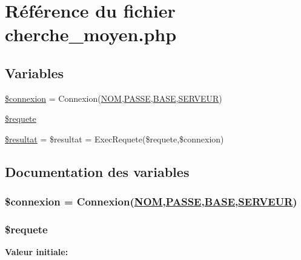 \hypertarget{cherche__moyen_8php}{
\section{R\'{e}f\'{e}rence du fichier cherche\_\-moyen.php}
\label{cherche__moyen_8php}
}
\subsection*{Variables}
\begin{CompactItemize}
\item 
\hyperlink{cherche__moyen_8php_a0}{\$connexion} = Connexion(\hyperlink{pma__connect_8php_a0}{NOM},\hyperlink{pma__connect_8php_a1}{PASSE},\hyperlink{pma__connect_8php_a3}{BASE},\hyperlink{pma__connect_8php_a2}{SERVEUR})
\item 
\hyperlink{cherche__moyen_8php_a1}{\$requete}
\item 
\hyperlink{cherche__moyen_8php_a2}{\$resultat} = \$resultat = Exec\-Requete(\$requete,\$connexion)
\end{CompactItemize}


\subsection{Documentation des variables}
\hypertarget{cherche__moyen_8php_a0}{
\subsubsection[\$connexion]{\setlength{\rightskip}{0pt plus 5cm}\$connexion = Connexion(\hyperlink{pma__connect_8php_a0}{NOM},\hyperlink{pma__connect_8php_a1}{PASSE},\hyperlink{pma__connect_8php_a3}{BASE},\hyperlink{pma__connect_8php_a2}{SERVEUR})}}
\label{cherche__moyen_8php_a0}


\hypertarget{cherche__moyen_8php_a1}{
\subsubsection[\$requete]{\setlength{\rightskip}{0pt plus 5cm}\$requete}}
\label{cherche__moyen_8php_a1}


{\bf Valeur initiale:}

